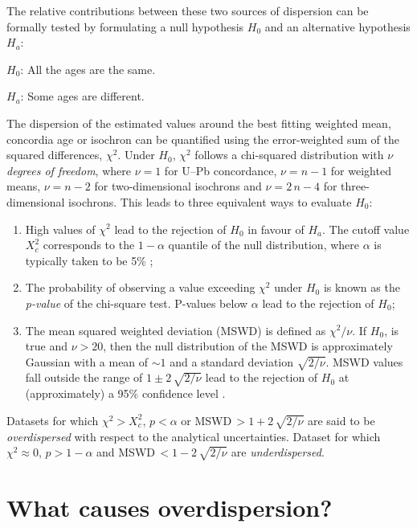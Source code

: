 \documentclass[gchron, manuscript]{copernicus}
\begin{document}
The relative contributions between these two sources of dispersion can
be formally tested by formulating a null hypothesis $H_0$ and an
alternative hypothesis $H_a$:

\begin{description}
\item{$H_0$:} All the ages are the same.
\item{$H_a$:} Some ages are different.
\end{description}

The dispersion of the estimated values around the best fitting
weighted mean, concordia age or isochron can be quantified using the
error-weighted sum of the squared differences, $\chi^2$.  Under $H_0$,
$\chi^2$ follows a chi-squared distribution with $\nu$ \emph{degrees
of freedom}, where $\nu = 1$ for U--Pb concordance, $\nu = n-1$ for
weighted means, $\nu = n-2$ for two-dimensional isochrons and $\nu =
2\,n - 4$ for three-dimensional isochrons. This leads to three
equivalent ways to evaluate $H_0$:

\begin{enumerate}
\item High values of $\chi^2$ lead to the rejection of $H_0$ in favour
  of $H_a$.  The cutoff value $X_c^2$ corresponds to the $1-\alpha$
  quantile of the null distribution, where $\alpha$ is typically taken
  to be 5\% \citep{pearson1900};
\item The probability of observing a value exceeding $\chi^2$ under $H_0$
  is known as the \emph{p-value} of the chi-square test. P-values
  below $\alpha$ lead to the rejection of $H_0$;
\item The mean squared weighted deviation (MSWD) is defined as
  $\chi^2/\nu$.  If $H_0$, is true and $\nu>20$, then the null
  distribution of the MSWD is approximately Gaussian with a mean of
  $\sim 1$ and a standard deviation $\sqrt{2/\nu}$. MSWD values fall
  outside the range of $1 \pm 2\,\sqrt{2/\nu}$ lead to the rejection
  of $H_0$ at (approximately) a 95\% confidence level
  \citep{wendt1991}.
\end{enumerate}

Datasets for which $\chi^2 > X_c^2$, $p < \alpha$ or
MSWD$\,>1+2\,\sqrt{2/\nu}$ are said to be \emph{overdispersed} with
respect to the analytical uncertainties. Dataset for which
$\chi^2 \approx 0$, $p > 1-\alpha$ and MSWD$\,<1-2\,\sqrt{2/\nu}$ are
\emph{underdispersed}.

\section{What causes overdispersion?}\label{sec:overdispersion}
\end{document}
